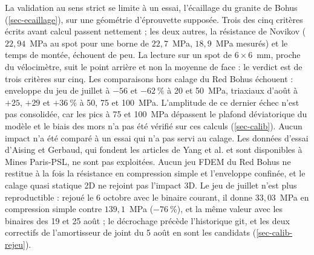 La validation au sens strict se limite à un essai, l'écaillage du granite de Bohus (\cref{sec-ecaillage}), sur une géométrie d'éprouvette supposée. Trois des cinq critères écrits avant calcul passent nettement ; les deux autres, la résistance de Novikov ($22{,}94$~MPa au spot pour une borne de $22{,}7$~MPa, $18{,}9$~MPa mesurés) et le temps de montée, échouent de peu. La lecture sur un spot de $6 \times 6$~mm, proche du vélocimètre, suit le point arrière et non la moyenne de face : le verdict est de trois critères sur cinq. Les comparaisons hors calage du Red Bohus échouent : enveloppe du jeu de juillet à $-56$ et $-62~\%$ à 20 et 50~MPa, triaxiaux d'août à $+25$, $+29$ et $+36~\%$ à 50, 75 et 100~MPa. L'amplitude de ce dernier échec n'est pas consolidée, car les pics à 75 et 100~MPa dépassent le plafond déviatorique du modèle et le biais des mors n'a pas été vérifié sur ces calculs (\cref{sec-calib}). Aucun impact n'a été comparé à un essai qui n'a pas servi au calage. Les données d'essai d'Aising et Gerbaud, qui fondent les articles de Yang et al. et sont disponibles à Mines Paris-PSL, ne sont pas exploitées. Aucun jeu FDEM du Red Bohus ne restitue à la fois la résistance en compression simple et l'enveloppe confinée, et le calage quasi statique 2D ne rejoint pas l'impact 3D. Le jeu de juillet n'est plus reproductible : rejoué le 6 octobre avec le binaire courant, il donne $33{,}03$~MPa en compression simple contre $139{,}1$~MPa ($-76~\%$), et la même valeur avec les binaires des 19 et 25 août ; le décrochage précède l'historique git, et les deux correctifs de l'amortisseur de joint du 5 août en sont les candidats (\cref{sec-calib-rejeu}).

